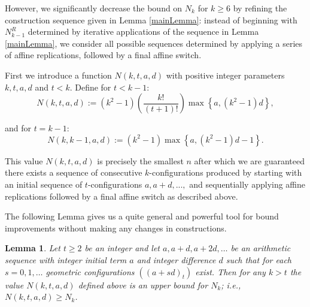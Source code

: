 \documentclass[reqno,12pt]{amsart}
\theoremstyle{plain}
\newtheorem{lemma}[theorem]{Lemma}
\theoremstyle{definition}
\theoremstyle{remark}
\begin{document}
However, we  significantly decrease the bound on $N_{k}$ for $k \geq 6$ by refining the construction sequence given in Lemma \ref{mainLemma}:
instead of beginning with $N^{R}_{k-1}$ determined by iterative applications of the sequence in Lemma \ref{mainLemma}, we consider all possible 
sequences determined by applying a series of affine replications, followed by a final affine switch.

First we introduce  a function $N(k,t,a,d)$ with positive integer parameters $k,t,a,d$ and $t < k$.
Define for $t < k-1$: 
\[N(k, t, a, d):= (k^{2} - 1)\left(\frac{k!}{(t+1)! }\right) \max\left\{  a, (k^{2}-1)d \right\}, \] 

and for $t = k-1$: 
\[N(k, k-1, a, d):= (k^{2} - 1) \max\left\{ a, (k^{2}-1)d - 1 \right\}. \]

This value $N(k, t, a, d)$ is precisely the smallest $n$ after which we are guaranteed there exists a sequence of consecutive $k$-configurations 
produced by starting with an initial sequence of $t$-configurations $a, a+d, ..., $ and sequentially applying affine replications followed by a final 
affine switch as described above. 
 
The following Lemma gives us a quite general and powerful tool for bound improvements without making any changes in constructions.


\begin{lemma}\label{lemma:main2} Let $t \geq 2$ be an integer and let $a, a+d, a+2d, \ldots$ be an arithmetic sequence with integer initial 
term $a$ and integer difference $d$ such that for each $s = 0,1, \ldots$ geometric configurations $((a+sd)_t)$ exist.  
Then for any $k > t$  the value $ N(k, t, a, d)$  defined above is an upper bound for  $N_k$; i.e.,
$N(k, t, a, d) \geq N_k$. 
\end{lemma}

\end{document}
